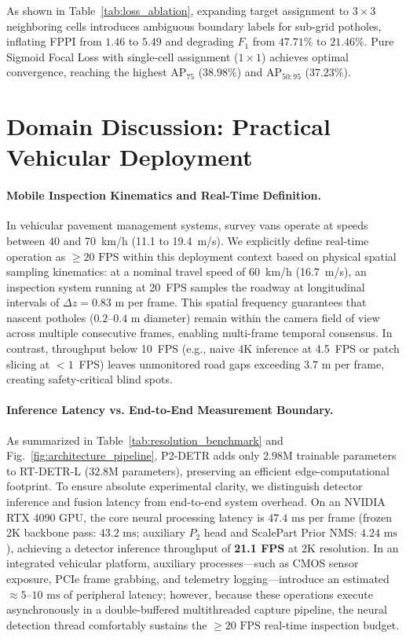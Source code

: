\documentclass[runningheads]{llncs}
\begin{document}
As shown in Table~\ref{tab:loss_ablation}, expanding target assignment to $3 \times 3$ neighboring cells introduces ambiguous boundary labels for sub-grid potholes, inflating FPPI from $1.46$ to $5.49$ and degrading $F_1$ from $47.71\%$ to $21.46\%$. Pure Sigmoid Focal Loss with single-cell assignment ($1\times 1$) achieves optimal convergence, reaching the highest $\text{AP}_{75}$ ($38.98\%$) and $\text{AP}_{50:95}$ ($37.23\%$).

\section{Domain Discussion: Practical Vehicular Deployment}

\paragraph{Mobile Inspection Kinematics and Real-Time Definition.}
In vehicular pavement management systems, survey vans operate at speeds between 40 and 70~km/h (11.1 to 19.4~m/s). We explicitly define real-time operation as $\ge 20\text{ FPS}$ within this deployment context based on physical spatial sampling kinematics: at a nominal travel speed of 60~km/h (16.7~m/s), an inspection system running at 20~FPS samples the roadway at longitudinal intervals of $\Delta z = 0.83\text{ m}$ per frame. This spatial frequency guarantees that nascent potholes ($0.2\text{--}0.4\text{ m}$ diameter) remain within the camera field of view across multiple consecutive frames, enabling multi-frame temporal consensus. In contrast, throughput below 10~FPS (e.g., naive 4K inference at 4.5~FPS or patch slicing at $<1$~FPS) leaves unmonitored road gaps exceeding $3.7\text{ m}$ per frame, creating safety-critical blind spots.

\paragraph{Inference Latency vs. End-to-End Measurement Boundary.}
As summarized in Table~\ref{tab:resolution_benchmark} and Fig.~\ref{fig:architecture_pipeline}, P2-DETR adds only $2.98\text{M}$ trainable parameters to RT-DETR-L ($32.8\text{M}$ parameters), preserving an efficient edge-computational footprint. To ensure absolute experimental clarity, we distinguish detector inference and fusion latency from end-to-end system overhead. On an NVIDIA RTX 4090 GPU, the core neural processing latency is $47.4\text{ ms}$ per frame (frozen 2K backbone pass: $43.2\text{ ms}$; auxiliary $P_2$ head and ScalePart Prior NMS: $4.24\text{ ms}$), achieving a detector inference throughput of \textbf{21.1 FPS} at 2K resolution. In an integrated vehicular platform, auxiliary processes---such as CMOS sensor exposure, PCIe frame grabbing, and telemetry logging---introduce an estimated $\approx 5\text{--}10\text{ ms}$ of peripheral latency; however, because these operations execute asynchronously in a double-buffered multithreaded capture pipeline, the neural detection thread comfortably sustains the $\ge 20\text{ FPS}$ real-time inspection budget.
\end{document}
